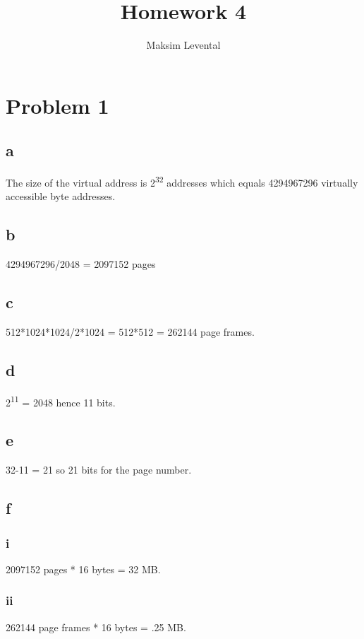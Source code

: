 \documentclass[11pt]{article} %
\title{Homework 4}
\author{Maksim Levental}
\begin{document}
\maketitle

\section*{Problem 1}
\subsection*{a}
The size of the virtual address is 2\textsuperscript{32} addresses which equals 4294967296 virtually accessible byte addresses. 
\subsection*{b}
4294967296/2048 = 2097152 pages
\subsection*{c}
512*1024*1024/2*1024 = 512*512 = 262144 page frames.
\subsection*{d}
2\textsuperscript{11} = 2048 hence 11 bits.
\subsection*{e}
32-11 = 21 so 21 bits for the page number.
\subsection*{f}
\subsubsection*{i}
2097152 pages * 16 bytes = 32 MB.
\subsubsection*{ii}
262144 page frames * 16 bytes = .25 MB.
\end{document}
